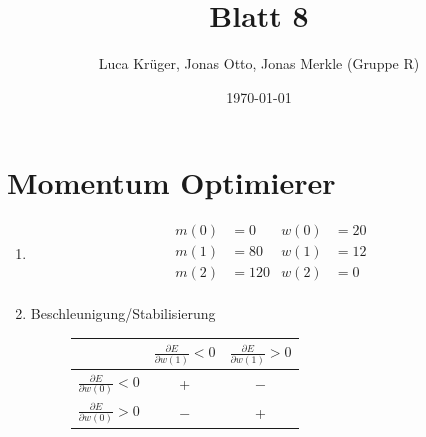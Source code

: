 \documentclass{article}
\title{Blatt 8}
\author{Luca Krüger, Jonas Otto, Jonas Merkle (Gruppe R)}
\date{\today}
\begin{document}
\maketitle

\section{Momentum Optimierer}
\begin{enumerate}[label=\arabic*.]
  \item
        \begin{align*}
          m(0) & = 0   & w(0) & = 20 \\
          m(1) & = 80  & w(1) & = 12 \\
          m(2) & = 120 & w(2) & = 0  \\
        \end{align*}
  \item Beschleunigung/Stabilisierung
        \begin{figure}[H]
          \centering

          \begin{tabular}{c|cc}
            \toprule
                                                                 & $\displaystyle \frac{\partial E}{\partial w(1)} < 0$ & $\displaystyle \frac{\partial E}{\partial w(1)} > 0$ \\
            \midrule
            $\displaystyle \frac{\partial E}{\partial w(0)} < 0$ & +                                                    & $-$                                                  \\
            $\displaystyle \frac{\partial E}{\partial w(0)} > 0$ & $-$                                                  & +                                                    \\
            \bottomrule
          \end{tabular}
        \end{figure}


\end{enumerate}
\end{document}
